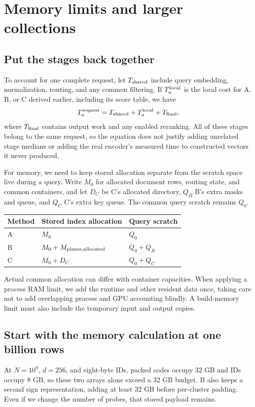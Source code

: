 \section{Memory limits and larger collections}
\subsection{Put the stages back together}
To account for one complete request, let $T_{\rm shared}$ include query embedding,
normalization, routing, and any common filtering. If $T_a^{\rm local}$ is the local cost for
A, B, or C derived earlier, including its score table, we have
\begin{equation}
T_a^{\rm request}=T_{\rm shared}+T_a^{\rm local}+T_{\rm final},
\label{eq:total}
\end{equation}
where $T_{\rm final}$ contains output work and any enabled reranking. All of these stages
belong to the same request, so the equation does not justify adding unrelated stage medians
or adding the real encoder's measured time to constructed vectors it never produced.

For memory, we need to keep stored allocation separate from the scratch space live during
a query. Write $M_0$ for allocated document rows, routing state, and common containers,
and let $D_C$ be C's allocated directory, $Q_B$ B's extra masks and queue, and $Q_C$ C's
extra key queue. The common query scratch remains $Q_0$.
\begin{center}
\begin{tabular}{@{}lll@{}}\toprule
Method & Stored index allocation & Query scratch\\\midrule
A & $M_0$ & $Q_0$\\
B & $M_0+M_{\rm planes,allocated}$ & $Q_0+Q_B$\\
C & $M_0+D_C$ & $Q_0+Q_C$\\\bottomrule
\end{tabular}
\end{center}
Actual common allocation can differ with container capacities. When applying a process RAM
limit, we add the runtime and other resident data once, taking care not to add overlapping
process and GPU accounting blindly. A build-memory limit must also include the temporary
input and output copies.

\subsection{Start with the memory calculation at one billion rows}
At $N=10^9$, $d=256$, and eight-byte IDs, packed codes occupy 32 GB and IDs occupy 8 GB,
so these two arrays alone exceed a 32 GB budget. B also keeps a second sign representation,
adding at least 32 GB before per-cluster padding. Even if we change the number of probes,
that stored payload remains.

